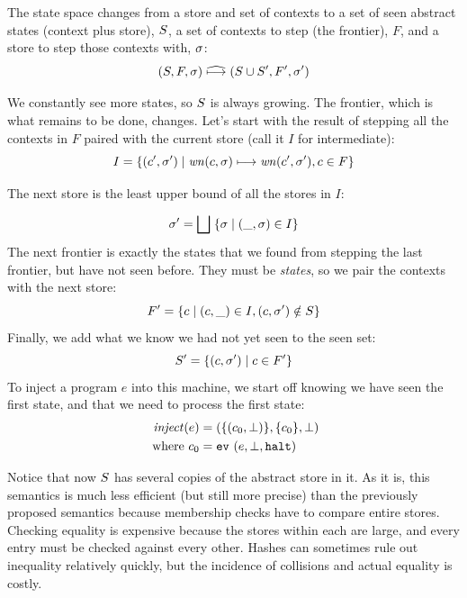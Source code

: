 \documentclass[preprint,onecolumn,9pt]{sigplanconf} %
\begin{document}
The state space changes from a store and set of contexts to a set
of seen abstract states (context plus store), $S$, a set of contexts to
step (the frontier), $F$, and a store to step those contexts with, $\sigma$:
\begin{equation*}
(S, F, \sigma) \mathrel{\widehat{\mathbin{\longmapsto}}} (S \cup S', F', \sigma')
\end{equation*}

We constantly see more states, so $S$ is always growing. The frontier,
which is what remains to be done, changes. Let's start with the result
of stepping all the contexts in $F$ paired with the current store (call it $I$ for intermediate):
%
\begin{equation*}
I = \{(c',\sigma') \mid \mathit{wn}(c, \sigma) \mathrel{\mathbin{\longmapsto}} \mathit{wn}(c', \sigma'), c \in F\}
\end{equation*}

The next store is the least upper bound of all the stores in $I$:

\begin{equation*}
\sigma' = \bigsqcup\; \{\sigma \mid (\_,\sigma) \in I\}
\end{equation*}
%
The next frontier is exactly the states that we found from stepping
the last frontier, but have not seen before. They must be
\emph{states}, so we pair the contexts with the next store:
%
\begin{equation*}
F' = \{c \mid (c,\_) \in I, (c,\sigma') \notin S\}
\end{equation*}
%
Finally, we add what we know we had not yet seen to the seen set:
\begin{equation*}
  S' = \{(c,\sigma') \mid c \in F'\}
\end{equation*}
%
To inject a program $e$ into this machine, we start off knowing we
have seen the first state, and that we need to process the first
state:
\begin{align*}
\mathit{inject}(e) &= (\{(c_0, \bot)\},\{c_0\},\bot) \\
\text{ where } c_0 &= {\tt ev}{\ }({e,\bot,{\tt halt}})
\end{align*}

Notice that now $S$ has several copies of the abstract store in it. As
it is, this semantics is much less efficient (but still more precise)
than the previously proposed semantics because membership checks have
to compare entire stores. Checking equality is expensive because the stores within each are
large, and every entry must be checked against every other. Hashes can
sometimes rule out inequality relatively quickly, but the incidence of
collisions and actual equality is costly.
\end{document}
